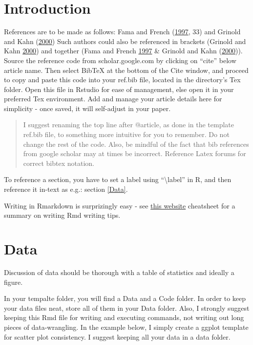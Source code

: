 \documentclass[11pt,preprint, authoryear]{elsarticle}
\numberwithin{equation}{section}
\numberwithin{figure}{section}
\numberwithin{table}{section}
\begin{document}
\section{\texorpdfstring{Introduction
\label{Introduction}}{Introduction }}\label{introduction}

References are to be made as follows: Fama and French
(\protect\hyperlink{ref-fama1997}{1997}, 33) and Grinold and Kahn
(\protect\hyperlink{ref-grinold2000}{2000}) Such authors could also be
referenced in brackets (Grinold and Kahn
\protect\hyperlink{ref-grinold2000}{2000}) and together (Fama and French
\protect\hyperlink{ref-fama1997}{1997} \& Grinold and Kahn
(\protect\hyperlink{ref-grinold2000}{2000})). Source the reference code
from scholar.google.com by clicking on ``cite'' below article name. Then
select BibTeX at the bottom of the Cite window, and proceed to copy and
paste this code into your ref.bib file, located in the directory's Tex
folder. Open this file in Rstudio for ease of management, else open it
in your preferred Tex environment. Add and manage your article details
here for simplicity - once saved, it will self-adjust in your paper.

\begin{quote}
I suggest renaming the top line after @article, as done in the template
ref.bib file, to something more intuitive for you to remember. Do not
change the rest of the code. Also, be mindful of the fact that bib
references from google scholar may at times be incorrect. Reference
Latex forums for correct bibtex notation.
\end{quote}

To reference a section, you have to set a label using
``\textbackslash{}label'' in R, and then reference it in-text as e.g.:
section \ref{Data}.

Writing in Rmarkdown is surprizingly easy - see
\href{https://www.rstudio.com/wp-content/uploads/2015/03/rmarkdown-reference.pdf}{this
website} cheatsheet for a summary on writing Rmd writing tips.

\section{\texorpdfstring{Data \label{Data}}{Data }}\label{data}

Discussion of data should be thorough with a table of statistics and
ideally a figure.

In your tempalte folder, you will find a Data and a Code folder. In
order to keep your data files neat, store all of them in your Data
folder. Also, I strongly suggest keeping this Rmd file for writing and
executing commands, not writing out long pieces of data-wrangling. In
the example below, I simply create a ggplot template for scatter plot
consistency. I suggest keeping all your data in a data folder.
\end{document}
